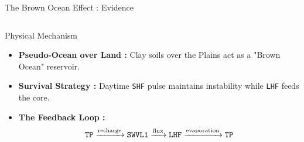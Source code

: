 \documentclass[8pt, aspectratio=169]{beamer}
\begin{document}
\begin{frame}{The Brown Ocean Effect : Evidence}
\begin{columns}[T]
        \begin{block}{Physical Mechanism}
            \begin{itemize}
                \item \textbf{Pseudo-Ocean over Land :} Clay soils over the Plains act as a "Brown Ocean" reservoir.
                \item \textbf{Survival Strategy :} Daytime \texttt{SHF} pulse maintains instability while \texttt{LHF} feeds the core.
                \item \textbf{The Feedback Loop :} 
                    \begin{equation}
                        \text{\texttt{TP}} \xrightarrow{\text{recharge}} \text{\texttt{SWVL1}} \xrightarrow{\text{flux}} \text{\texttt{LHF}} \xrightarrow{\text{evaporation}} \text{\texttt{TP}}
                    \end{equation}
            \end{itemize}
        \end{block}
    \end{columns}


\end{frame}
\end{document}
